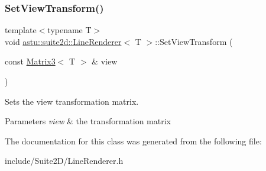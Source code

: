 \subsubsection{\texorpdfstring{Set\+View\+Transform()}{SetViewTransform()}}
{\footnotesize\ttfamily template$<$typename T$>$ \\
void \hyperlink{classastu_1_1suite2d_1_1LineRenderer}{astu\+::suite2d\+::\+Line\+Renderer}$<$ T $>$\+::Set\+View\+Transform (\begin{DoxyParamCaption}\item[{const \hyperlink{classastu_1_1Matrix3}{Matrix3}$<$ T $>$ \&}]{view }\end{DoxyParamCaption})\hspace{0.3cm}{\ttfamily [inline]}}

Sets the view transformation matrix.


\begin{DoxyParams}{Parameters}
{\em view} & the transformation matrix \\
\hline
\end{DoxyParams}


The documentation for this class was generated from the following file\+:\begin{DoxyCompactItemize}
\item 
include/\+Suite2\+D/Line\+Renderer.\+h\end{DoxyCompactItemize}
